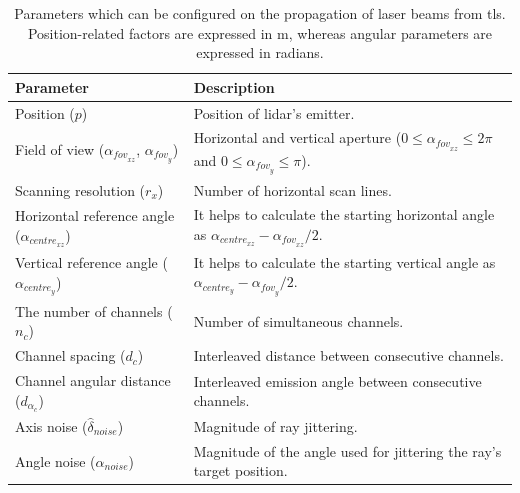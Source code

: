 \renewcommand{\arraystretch}{1.2}
\begin{table}
    \small
    \centering
    \caption{Parameters which can be configured on the propagation of laser beams from \acrshort{tls}. Position-related factors are expressed in \si{\meter}, whereas angular parameters are expressed in radians.}
    \label{table:tls_parameters}
    \begin{tabular}{ll}
    \toprule
    \textbf{Parameter} & \textbf{Description} \\
    \midrule
    Position ($p$) & Position of \acrshort{lidar}'s emitter.\\
    Field of view ($\alpha_{\textit{fov}_{xz}}$, $\alpha_{\textit{fov}_{y}}$) & Horizontal and vertical aperture ($0 \leq \alpha_{\textit{fov}_{xz}} \leq 2\pi$ and $0 \leq \alpha_{\textit{fov}_{y}} \leq \pi$). \\
    Scanning resolution ($r_{x}$) & Number of horizontal scan lines. \\
    Horizontal reference angle ($\alpha_{\textit{centre}_{xz}}$) & It helps to calculate the starting horizontal angle as $\alpha_{\textit{centre}_{xz}} - \alpha_{\textit{fov}_{xz}} / 2$. \\
    Vertical reference angle ($\alpha_{\textit{centre}_{y}}$) & It helps to calculate the starting vertical angle as $\alpha_{\textit{centre}_{y}} - \alpha_{\textit{fov}_{y}} / 2$. \\
    The number of channels ($n_{c}$) & Number of simultaneous channels. \\
    Channel spacing ($d_{c}$) & Interleaved distance between consecutive channels.\\
    Channel angular distance ($d_{\alpha_{c}}$) & Interleaved emission angle between consecutive channels.\\
    Axis noise ($\hat{\delta}_{\textit{noise}}$) & Magnitude of ray jittering. \\
    Angle noise ($\alpha_{\textit{noise}}$) & Magnitude of the angle used for jittering the ray's target position. \\
    \bottomrule
    \end{tabular}
    \libertineNormal
\end{table}
\renewcommand{\arraystretch}{1}

